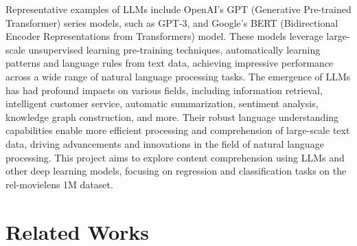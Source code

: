 \documentclass{sigkddExp}
\begin{document}
\vspace{3mm}\newline
Representative examples of LLMs include OpenAI's GPT (Generative Pre-trained Transformer) series models, such as GPT-3, and Google's BERT (Bidirectional Encoder Representations from Transformers) model. These models leverage large-scale unsupervised learning pre-training techniques, automatically learning patterns and language rules from text data, achieving impressive performance across a wide range of natural language processing tasks.
\vspace{3mm}\newline
The emergence of LLMs has had profound impacts on various fields, including information retrieval, intelligent customer service, automatic summarization, sentiment analysis, knowledge graph construction, and more. Their robust language understanding capabilities enable more efficient processing and comprehension of large-scale text data, driving advancements and innovations in the field of natural language processing.
This project aims to explore content comprehension using LLMs and other deep learning models, focusing on regression and classification tasks on the rel-movielens 1M dataset.




\section{Related Works}
\vspace{3mm}
\end{document}
